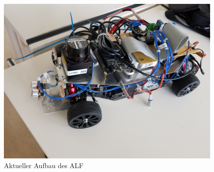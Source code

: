 


\begin{figure}[hbtp]
\centering
\includegraphics[scale=0.1]{images/chapter2/alf_old.jpg}
\caption{Aktueller Aufbau des ALF}
\label{fig:alf_new}
\end{figure}